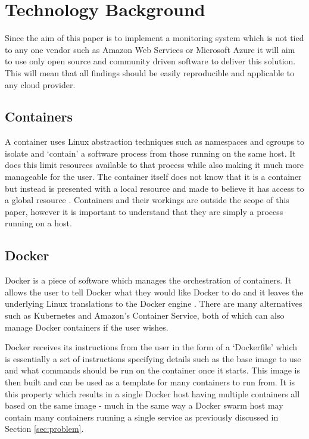 \section{Technology Background}
\label{sec:tech}
Since the aim of this paper is to implement a monitoring system which is not tied to any one vendor such as Amazon Web Services or Microsoft Azure it will aim to use only open source and community driven software to deliver this solution. This will mean that all findings should be easily reproducible and applicable to any cloud provider.

\subsection{Containers}
A container uses Linux abstraction techniques such as namespaces and cgroups to isolate and `contain' a software process from those running on the same host. It does this limit resources available to that process while also making it much more manageable for the user. The container itself does not know that it is a container but instead is presented with a local resource and made to believe it has access to a global resource \citep{Kerrisk2013}. Containers and their workings are outside the scope of this paper, however it is important to understand that they are simply a process running on a host.

\subsection{Docker}
Docker is a piece of software which manages the orchestration of containers. It allows the user to tell Docker what they would like Docker to do and it leaves the underlying Linux translations to the Docker engine \citep{docker2016}. There are many alternatives such as Kubernetes and Amazon's Container Service, both of which can also manage Docker containers if the user wishes.

Docker receives its instructions from the user in the form of a `Dockerfile' which is essentially a set of instructions specifying details such as the base image to use and what commands should be run on the container once it starts. This image is then built and can be used as a template for many containers to run from. It is this property which results in a single Docker host having multiple containers all based on the same image - much in the same way a Docker swarm host may contain many containers running a single service as previously discussed in Section \ref{sec:problem}.

